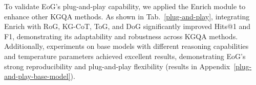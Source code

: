 \documentclass[11pt]{article}
\begin{document}
\begin{table}[]
\centering
{}
\caption{Impact of the Enrich module as a plugin enhancing other KGQA methods.}
\label{plug-and-play}
\end{table}

To validate EoG's plug-and-play capability, we applied the Enrich module to enhance other KGQA methods. As shown in Tab.~\ref{plug-and-play}, integrating Enrich with RoG, KG-CoT, ToG, and DoG significantly improved Hits@1 and F1, demonstrating its adaptability and robustness across KGQA methods. 
Additionally, experiments on base models with different reasoning capabilities and temperature parameters achieved excellent results, demonstrating EoG's strong reproducibility and plug-and-play flexibility (results in Appendix~\ref{plug-and-play-base-model}).

\end{document}
